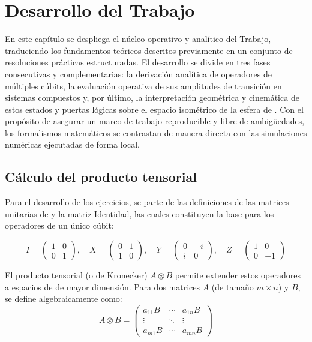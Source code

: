 \documentclass[11pt,a4paper,spanish]{book}
\begin{document}
\chapter{Desarrollo del Trabajo}

En este capítulo se despliega el núcleo operativo y analítico del Trabajo, traduciendo los fundamentos teóricos descritos previamente en un conjunto de resoluciones prácticas estructuradas. El desarrollo se divide en tres fases consecutivas y complementarias: la derivación analítica de operadores de múltiples cúbits, la evaluación operativa de sus amplitudes de transición en sistemas compuestos y, por último, la interpretación geométrica y cinemática de estos estados y puertas lógicas sobre el espacio isométrico de la esfera de \cite{bloch1946}. Con el propósito de asegurar un marco de trabajo reproducible y libre de ambigüedades, los formalismos matemáticos se contrastan de manera directa con las simulaciones numéricas ejecutadas de forma local.

\section{Cálculo del producto tensorial}

Para el desarrollo de los ejercicios, se parte de las definiciones de las matrices unitarias de \cite{pauli1927} y la matriz Identidad, las cuales constituyen la base para los operadores de un único cúbit:

\[ 
I = \begin{pmatrix} 1 & 0 \\ 0 & 1 \end{pmatrix}, \quad 
X = \begin{pmatrix} 0 & 1 \\ 1 & 0 \end{pmatrix}, \quad 
Y = \begin{pmatrix} 0 & -i \\ i & 0 \end{pmatrix}, \quad 
Z = \begin{pmatrix} 1 & 0 \\ 0 & -1 \end{pmatrix} 
\]

El producto tensorial (o de Kronecker) $A \otimes B$ permite extender estos operadores a espacios de \cite{hilbert1912} de mayor dimensión. Para dos matrices $A$ (de tamaño $m \times n$) y $B$, se define algebraicamente como:
\[ A \otimes B = \begin{pmatrix} a_{11}B & \cdots & a_{1n}B \\ \vdots & \ddots & \vdots \\ a_{m1}B & \cdots & a_{mn}B \end{pmatrix} \]
\end{document}
